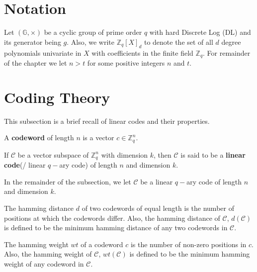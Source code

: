 \section{Notation}
Let $(\mathbb{G},\times)$ be a cyclic group of prime order $q$ with hard Discrete Log (DL) and its generator 
being $g$. 
Also, we write $\mathbb{Z}_{q}[X]_d$ to denote the set of all $d$ degree 
polynomials univariate in $X$ with coefficients in the finite field $\mathbb{Z}_q$. For remainder of the 
chapter we let $n>t$ for some positive integers $n$ and $t$.

\section{Coding Theory}
\label{sec:linear-codes}
This subsection is a brief recall of linear codes and their properties.

\begin{definition}[Codeword]
  A \textbf{codeword} of length $n$ is a vector $c\in \mathbb{Z}_q^n$.
\end{definition}

\begin{definition}\cite{../gallian2024contemporary}
  If $\mathcal{C}$ be a vector subspace of $\mathbb{Z}_q^n$ with dimension $k$, then $\mathcal{C}$ is 
  said to be a \textbf{linear code}(/ linear $q-$ary code) of length $n$ and dimension $k$.
\end{definition}

In the remainder of the subsection, we let $\mathcal{C}$ be a linear $q-$ary code of length $n$ and 
dimension $k$.

\begin{definition}
  The hamming distance $d$ of two codewords of equal length is the number of positions at which the 
  codewords differ. Also, the hamming distance of $\mathcal{C}$, $d(\mathcal{C})$ is defined to be the 
  minimum hamming distance of any two codewords in $\mathcal{C}$.
\end{definition}

\begin{definition}
  The hamming weight $wt$ of a codeword $c$ is the number of non-zero positions in $c$. Also, the hamming weight of
  $\mathcal{C}$, $wt(\mathcal{C})$ is defined to be the minimum hamming weight of any codeword in $\mathcal{C}$.
\end{definition}

